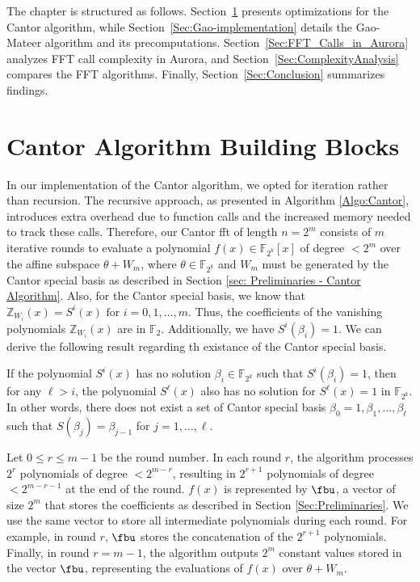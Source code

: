 


 The chapter is structured as follows.  Section~\ref{Sec:Cantor Implementation} presents optimizations for the Cantor algorithm, while Section~\ref{Sec:Gao-implementation} details the Gao-Mateer algorithm and its precomputations. Section~\ref{Sec:FFT_Calls_in_Aurora} analyzes FFT call complexity in Aurora, and Section~\ref{Sec:ComplexityAnalysis} compares the FFT algorithms. Finally, Section~\ref{Sec:Conclusion} summarizes findings.


\section{Cantor Algorithm Building Blocks}\label{Sec:Cantor Implementation}

In our implementation of the Cantor algorithm, we opted for iteration rather than recursion. The recursive approach, as presented in Algorithm \ref{Algo:Cantor}, introduces extra overhead due to function calls and the increased memory needed to track these calls. Therefore, our Cantor \gls{fft} of length $n = 2^m$ consists of $m$ iterative rounds to evaluate a polynomial $f(x)\in\mathbb{F}_{2^k}[x]$ of degree $<2^m$ over the affine subspace $\theta + W_m$, where $\theta \in \mathbb{F}_{2^k}$ and $W_m$ must be generated by the Cantor special basis as described in Section \ref{sec: Preliminaries - Cantor Algorithm}. Also, for the Cantor special basis, we know that $\mathbb{Z}_{W_{i}}(x)=S^{i}(x) \text{ for } i=0,1,\ldots,m$. Thus, the coefficients of the vanishing polynomials $\mathbb{Z}_{W_{i}}(x)$ are in $\mathbb{F}_2$. Additionally, we have $S^{i}(\beta_{i}) = 1$. We can derive the following result regarding th existance of the Cantor special basis.

\begin{theorem}
	If the polynomial $S^{i}(x)$ has no solution $\beta_{i} \in \mathbb{F}_{2^k}$ such that $S^i(\beta_i) = 1$, then for any $\ell > i$, the polynomial $S^{\ell}(x)$ also has no solution for $S^{\ell}(x) = 1$ in $\mathbb{F}_{2^k}$. In other words, there does not exist a set of Cantor special basis ${\beta_0=1, \beta_1, \ldots, \beta_{\ell}}$ such that $S(\beta_j) = \beta_{j-1}$ for $j=1,\ldots,\ell$.
 \end{theorem}


Let $0 \leq r \leq m-1$ be the round number. In each round $r$, the algorithm processes $2^r$ polynomials of degree $< 2^{m-r}$, resulting in $2^{r+1}$ polynomials of degree $< 2^{m-r-1}$ at the end of the round. $f(x)$ is represented by $\fbu$, a vector of size $2^m$ that stores the coefficients as described in Section \ref{Sec:Preliminaries}. We use the same vector to store all intermediate polynomials during each round. For example, in round $r$, $\fbu$ stores the concatenation of  the $2^{r+1}$ polynomials. Finally, in round $r = m-1$, the algorithm outputs $2^m$ constant values stored in the vector $\fbu$, representing the evaluations of $f(x)$ over $\theta + W_m$. 

